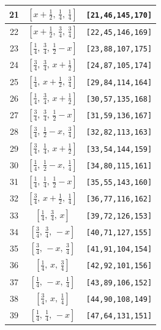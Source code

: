 \documentclass[fleqn,8pt]{jsarticle}
\begin{document}
\begin{longtable}{ccc}
21 & $\left[ x + \frac{1}{2},\, \frac{1}{4},\, \frac{1}{4} \right]$ & {\tt [21,46,145,170]} \\ \hline
22 & $\left[ x + \frac{1}{2},\, \frac{3}{4},\, \frac{3}{4} \right]$ & {\tt [22,45,146,169]} \\ \hline
23 & $\left[ \frac{1}{4},\, \frac{3}{4},\, \frac{1}{2} - x \right]$ & {\tt [23,88,107,175]} \\ \hline
24 & $\left[ \frac{3}{4},\, \frac{3}{4},\, x + \frac{1}{2} \right]$ & {\tt [24,87,105,174]} \\ \hline
25 & $\left[ \frac{1}{4},\, x + \frac{1}{2},\, \frac{3}{4} \right]$ & {\tt [29,84,114,164]} \\ \hline
26 & $\left[ \frac{1}{4},\, \frac{3}{4},\, x + \frac{1}{2} \right]$ & {\tt [30,57,135,168]} \\ \hline
27 & $\left[ \frac{3}{4},\, \frac{3}{4},\, \frac{1}{2} - x \right]$ & {\tt [31,59,136,167]} \\ \hline
28 & $\left[ \frac{3}{4},\, \frac{1}{2} - x,\, \frac{3}{4} \right]$ & {\tt [32,82,113,163]} \\ \hline
29 & $\left[ \frac{3}{4},\, \frac{1}{4},\, x + \frac{1}{2} \right]$ & {\tt [33,54,144,159]} \\ \hline
30 & $\left[ \frac{1}{4},\, \frac{1}{2} - x,\, \frac{1}{4} \right]$ & {\tt [34,80,115,161]} \\ \hline
31 & $\left[ \frac{1}{4},\, \frac{1}{4},\, \frac{1}{2} - x \right]$ & {\tt [35,55,143,160]} \\ \hline
32 & $\left[ \frac{3}{4},\, x + \frac{1}{2},\, \frac{1}{4} \right]$ & {\tt [36,77,116,162]} \\ \hline
33 & $\left[ \frac{1}{4},\, \frac{3}{4},\, x \right]$ & {\tt [39,72,126,153]} \\ \hline
34 & $\left[ \frac{3}{4},\, \frac{3}{4},\, - x \right]$ & {\tt [40,71,127,155]} \\ \hline
35 & $\left[ \frac{3}{4},\, - x,\, \frac{3}{4} \right]$ & {\tt [41,91,104,154]} \\ \hline
36 & $\left[ \frac{1}{4},\, x,\, \frac{3}{4} \right]$ & {\tt [42,92,101,156]} \\ \hline
37 & $\left[ \frac{1}{4},\, - x,\, \frac{1}{4} \right]$ & {\tt [43,89,106,152]} \\ \hline
38 & $\left[ \frac{3}{4},\, x,\, \frac{1}{4} \right]$ & {\tt [44,90,108,149]} \\ \hline
39 & $\left[ \frac{1}{4},\, \frac{1}{4},\, - x \right]$ & {\tt [47,64,131,151]} \\ \hline

\end{longtable}
\end{document}
